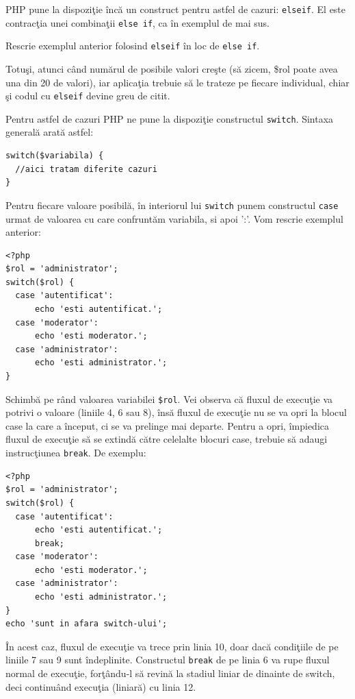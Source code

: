 PHP pune la dispoziţie încă un construct pentru astfel de cazuri: \texttt{elseif}.
El este contracţia unei combinaţii \texttt{else if}, ca în exemplul de mai sus.

\begin{Exercise}[title={elseif}]
Rescrie exemplul anterior folosind \texttt{elseif} în loc de \texttt{else if}.
\end{Exercise}

Totuşi, atunci când numărul de posibile valori creşte (să zicem, \$rol poate avea
una din 20 de valori), iar aplicaţia trebuie să le trateze pe fiecare individual,
chiar şi codul cu \texttt{elseif} devine greu de citit.

Pentru astfel de cazuri PHP ne pune la dispoziţie constructul \texttt{switch}.
Sintaxa generală arată astfel:
\begin{lstlisting}
switch($variabila) {
  //aici tratam diferite cazuri
}
\end{lstlisting}
Pentru fiecare valoare posibilă, în interiorul lui \texttt{switch}
punem constructul \texttt{case} urmat de valoarea cu care confruntăm
variabila, si apoi ':'. Vom rescrie exemplul anterior:

\begin{lstlisting}
<?php
$rol = 'administrator';
switch($rol) {
  case 'autentificat':
	  echo 'esti autentificat.';
  case 'moderator':
	  echo 'esti moderator.';
  case 'administrator':
	  echo 'esti administrator.';
}
\end{lstlisting}
Schimbă pe rând valoarea variabilei \texttt{\$rol}. Vei observa că
fluxul de execuţie va potrivi o valoare (liniile 4, 6 sau 8), însă
fluxul de execuţie nu se va opri la blocul {\glqq}case{\grqq} la care a început,
ci se va {\glqq}prelinge{\grqq} mai departe. Pentru a opri, împiedica fluxul de
execuţie să se extindă către celelalte blocuri {\glqq}case{\grqq}, trebuie să
adaugi instrucţiunea \texttt{break}. De exemplu:
\begin{lstlisting}
<?php
$rol = 'administrator';
switch($rol) {
  case 'autentificat':
	  echo 'esti autentificat.';
	  break;
  case 'moderator':
	  echo 'esti moderator.';
  case 'administrator':
	  echo 'esti administrator.';
}
echo 'sunt in afara switch-ului';
\end{lstlisting}
În acest caz, fluxul de execuţie va trece prin linia 10, doar dacă
condiţiile de pe liniile 7 sau 9 sunt îndeplinite. Constructul
\texttt{break} de pe linia 6 va rupe fluxul normal de execuţie,
forţându-l să revină la stadiul liniar de dinainte de switch,
deci continuând execuţia (liniară) cu linia 12.

